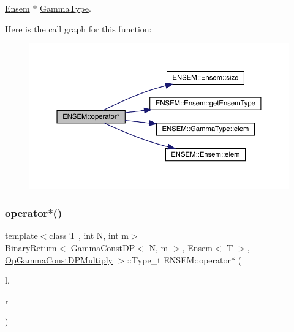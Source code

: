 \mbox{\hyperlink{classENSEM_1_1Ensem}{Ensem}} $\ast$ \mbox{\hyperlink{classENSEM_1_1GammaType}{Gamma\+Type}}. 

Here is the call graph for this function\+:\nopagebreak
\begin{figure}[H]
\begin{center}
\leavevmode
\includegraphics[width=350pt]{d1/d9e/group__eensem_ga5a4ddba3b396c11e474246b57940a2cc_cgraph}
\end{center}
\end{figure}
\mbox{\label{group__eensem_ga60f93a7eee86e9559faa6e162cf9b9a1}} 
\subsubsection{\texorpdfstring{operator$\ast$()}{operator*()}\hspace{0.1cm}{\footnotesize\ttfamily [8/11]}}
{\footnotesize\ttfamily template$<$class T , int N, int m$>$ \\
\mbox{\hyperlink{structENSEM_1_1BinaryReturn}{Binary\+Return}}$<$ \mbox{\hyperlink{classENSEM_1_1GammaConstDP}{Gamma\+Const\+DP}}$<$ \mbox{\hyperlink{operator__name__util_8cc_a7722c8ecbb62d99aee7ce68b1752f337}{N}}, m $>$, \mbox{\hyperlink{classENSEM_1_1Ensem}{Ensem}}$<$ T $>$, \mbox{\hyperlink{structENSEM_1_1OpGammaConstDPMultiply}{Op\+Gamma\+Const\+D\+P\+Multiply}} $>$\+::Type\+\_\+t E\+N\+S\+E\+M\+::operator$\ast$ (\begin{DoxyParamCaption}\item[{const \mbox{\hyperlink{classENSEM_1_1GammaConstDP}{Gamma\+Const\+DP}}$<$ \mbox{\hyperlink{operator__name__util_8cc_a7722c8ecbb62d99aee7ce68b1752f337}{N}}, m $>$ \&}]{l,  }\item[{const \mbox{\hyperlink{classENSEM_1_1Ensem}{Ensem}}$<$ T $>$ \&}]{r }\end{DoxyParamCaption})\hspace{0.3cm}{\ttfamily [inline]}}



